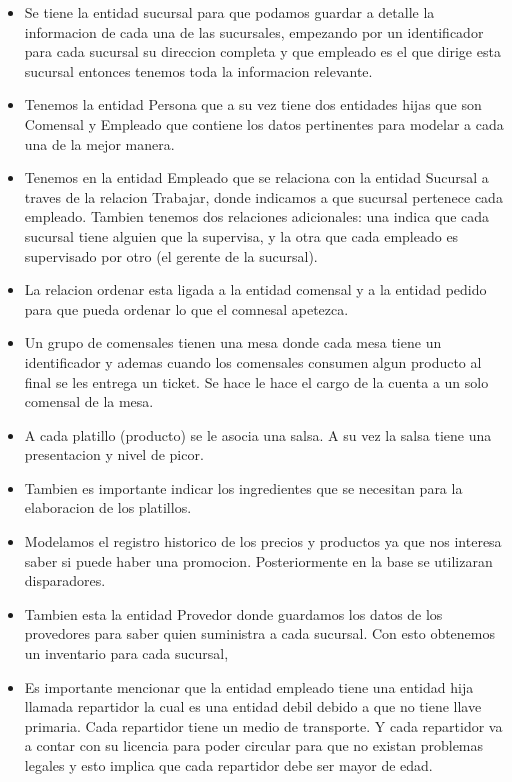 \documentclass[11pt,letterpaper]{article}
\begin{document}
\begin{itemize}

\item Se tiene la entidad sucursal para que podamos guardar a detalle la informacion de cada una de las sucursales, empezando por un identificador            para cada sucursal  su direccion completa y que empleado es el que dirige esta sucursal entonces tenemos toda la informacion relevante.

\item Tenemos la entidad Persona que a su vez tiene dos entidades hijas que son Comensal y Empleado que contiene los datos pertinentes para modelar a       cada una de la mejor manera.

\item Tenemos en la entidad Empleado que se relaciona con la entidad Sucursal a traves de la relacion Trabajar, donde indicamos a que sucursal pertenece cada empleado. Tambien tenemos dos relaciones adicionales: una indica que cada sucursal tiene alguien que la supervisa, y la otra que cada empleado es supervisado por otro (el gerente de la sucursal).

\item La relacion ordenar esta ligada a la entidad comensal y a la entidad pedido para que pueda ordenar lo que el comnesal apetezca.  

\item Un grupo de comensales tienen una mesa donde cada mesa tiene un identificador y ademas cuando los comensales consumen algun producto al final se les entrega un ticket. Se hace le hace el cargo de la cuenta a un solo comensal de la mesa.

\item A cada platillo (producto) se le asocia una salsa. A su vez la salsa tiene una presentacion y nivel de picor.

\item Tambien es importante indicar los ingredientes que se necesitan para la elaboracion de los platillos.

\item Modelamos el registro historico  de los precios y productos ya que nos interesa saber si puede haber una promocion. Posteriormente en la                 base se utilizaran disparadores.

\item Tambien esta la entidad Provedor donde guardamos los datos de los provedores para saber quien suministra a cada sucursal. Con esto obtenemos un  inventario para cada sucursal,        

\item Es importante mencionar que la entidad empleado tiene una entidad hija llamada repartidor la cual es una entidad debil debido a que no tiene llave primaria. Cada repartidor tiene un medio de transporte. Y cada repartidor va a contar con su licencia para poder circular para que no existan problemas legales y esto implica que cada repartidor debe ser mayor de edad.

\end{itemize}





\end{document}

